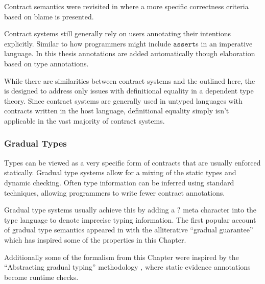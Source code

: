 Contract semantics were revisited in \cite{10.1145/1925844.1926410,10.1007/978-3-642-28869-2_11} where a more specific correctness criteria based on blame is presented.

Contract systems still generally rely on users annotating their intentions explicitly.
Similar to how programmers might include $\mathtt{assert}$s in an imperative language.
In this thesis annotations are added automatically though elaboration based on type annotations.
 
While there are similarities between contract systems and the \csys{} outlined here, the \csys{} is designed to address only issues with definitional equality in a dependent type theory.
Since contract systems are generally used in untyped languages with contracts written in the host language, definitional equality simply isn't applicable in the vast majority of contract systems.


\subsubsection{Gradual Types}
 
Types can be viewed as a very specific form of contracts that are usually enforced statically.
Gradual type systems allow for a mixing of the static types and dynamic checking.
Often type information can be inferred using standard techniques, allowing programmers to write fewer contract annotations.
 
Gradual type systems usually achieve this by adding a $?$ meta character into the type language to denote imprecise typing information.
The first popular account of gradual type semantics appeared in \cite{siek_et_al:LIPIcs:2015:5031} with the alliterative ``gradual guarantee'' which has inspired some of the properties in this Chapter.
 
 
Additionally some of the formalism from this Chapter were inspired by the ``Abstracting gradual typing'' methodology \cite{10.1145/2837614.2837670}, where static evidence annotations become runtime checks.
 
